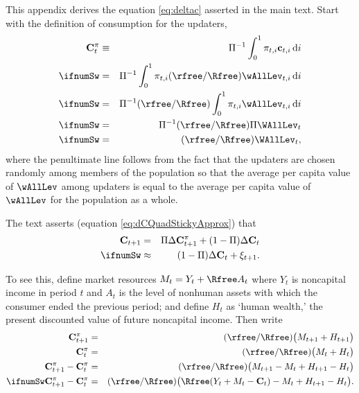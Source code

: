 
This appendix derives the equation \eqref{eq:deltac} asserted in the main text.  Start with the definition of consumption for the updaters,
\begin{eqnarray*}
   \mathbf{C}_{t}^{{\pi}}  & \equiv & \Pi^{-1}     \int_{0}^{1} \pi_{t,i}\mathbf{c}_{t,i} \,\text{d}i
\\ \ifnumSw & = & \Pi^{-1}\int_{0}^{1} \pi_{t,i}(\rfree/\Rfree) \wAllLev_{t,i}\, \text{d}i \nonumber
\\ \ifnumSw & = & \Pi^{-1}(\rfree/\Rfree) \int_{0}^{1} \pi_{t,i}\wAllLev_{t,i} \,\text{d}i \nonumber
\\ \ifnumSw & = & \Pi^{-1}(\rfree/\Rfree) \Pi \WAllLev_{t} \nonumber
\\ \ifnumSw & = & (\rfree/\Rfree) \WAllLev_{t}, \nonumber
\end{eqnarray*}
where the penultimate line follows from the fact that the updaters are
chosen randomly among members of the population so that the average
per capita value of $\wAllLev$ among updaters is equal to the
average per capita value of $\wAllLev$ for the population as a whole.


The text asserts (equation \eqref{eq:dCQuadStickyApprox}) that
\begin{eqnarray*}
        \mathbf{C}_{t+1} & = & \Pi \Delta \mathbf{C}^{{\pi}}_{t+1} + (1-\Pi) \Delta \mathbf{C}_{t} %
\\ \ifnumSw   & \approx & (1-\Pi) \Delta \mathbf{C}_{t} + \xi_{t+1}. \nonumber
\end{eqnarray*}

To see this, define market resources $M_{t}=Y_{t}+\Rfree A_{t}$ where $Y_{t}$ is noncapital income in period $t$ and $A_{t}$ is the level of nonhuman assets with which the consumer ended the previous period; and define $H_{t}$ as `human wealth,' the present discounted value of future noncapital income.  Then write
\begin{eqnarray}
        \mathbf{C}_{t+1}^{{\pi}} & = & (\rfree/\Rfree)\big(M_{t+1}+H_{t+1}\big)  \nonumber \\
        \mathbf{C}_{t}^{{\pi}} & = & (\rfree/\Rfree)\big(M_{t}+H_{t}\big)  \nonumber \\
        \mathbf{C}_{t+1}^{{\pi}}-\mathbf{C}_{t}^{{\pi}} & = & (\rfree/\Rfree)\big(M_{t+1}-M_{t}+H_{t+1}-H_{t}\big)  \nonumber
\\ \ifnumSw      \mathbf{C}_{t+1}^{{\pi}}-\mathbf{C}_{t}^{{\pi}} & = & (\rfree/\Rfree)\big(\Rfree(Y_{t}+M_{t}-\mathbf{C}_{t})-M_{t}+H_{t+1}-H_{t}\big).    \label{eq:notquite}
\end{eqnarray}

